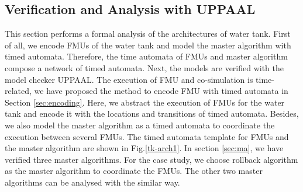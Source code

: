 \subsection{Verification and Analysis with UPPAAL}
\label{sec:mauppaal}
This section performs a formal analysis of the architectures of water tank. First of all, we encode FMUs of the water tank and model the master algorithm with timed automata. Therefore, the time automata of FMUs and master algorithm compose a network of timed automata. Next, the models are verified with the model checker UPPAAL. 
The execution of FMU and co-simulation is time-related, we have proposed the method to encode FMU with timed automata in Section \ref{sec:encoding}. Here, we abstract the execution of FMUs for the water tank and encode it with the locations and transitions of timed automata. Besides, we also model the master algorithm as a timed automata to coordinate the execution between several FMUs. The timed automata template for FMUs and the master algorithm are shown in Fig.\ref{tk-arch1}. In section \ref{sec:ma}, we have verified three master algorithms. For the case study, we choose rollback algorithm as the master algorithm to coordinate the FMUs. The other two master algorithms can be analysed with the similar way. 

